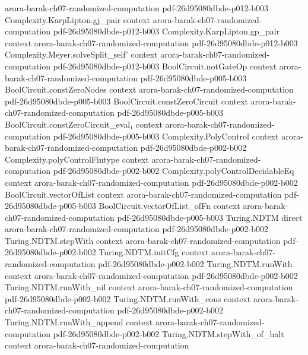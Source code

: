 \begin{theorem}
  {arora-barak-ch07-randomized-computation}
  {pdf-26d95080dbde-p012-b003}
\proofstep
  {Complexity.KarpLipton.gj_pair}
  {context}
  {arora-barak-ch07-randomized-computation}
  {pdf-26d95080dbde-p012-b003}
\proofstep
  {Complexity.KarpLipton.gp_pair}
  {context}
  {arora-barak-ch07-randomized-computation}
  {pdf-26d95080dbde-p012-b003}
\proofstep
  {Complexity.Meyer.solveSplit_self'}
  {context}
  {arora-barak-ch07-randomized-computation}
  {pdf-26d95080dbde-p012-b003}
\proofstep
  {BoolCircuit.notGateOp}
  {context}
  {arora-barak-ch07-randomized-computation}
  {pdf-26d95080dbde-p005-b003}
\proofstep
  {BoolCircuit.constZeroNodes}
  {context}
  {arora-barak-ch07-randomized-computation}
  {pdf-26d95080dbde-p005-b003}
\proofstep
  {BoolCircuit.constZeroCircuit}
  {context}
  {arora-barak-ch07-randomized-computation}
  {pdf-26d95080dbde-p005-b003}
\proofstep
  {BoolCircuit.constZeroCircuit_eval₁}
  {context}
  {arora-barak-ch07-randomized-computation}
  {pdf-26d95080dbde-p005-b003}
\proofstep
  {Complexity.PolyControl}
  {context}
  {arora-barak-ch07-randomized-computation}
  {pdf-26d95080dbde-p002-b002}
\proofstep
  {Complexity.polyControlFintype}
  {context}
  {arora-barak-ch07-randomized-computation}
  {pdf-26d95080dbde-p002-b002}
\proofstep
  {Complexity.polyControlDecidableEq}
  {context}
  {arora-barak-ch07-randomized-computation}
  {pdf-26d95080dbde-p002-b002}
\proofstep
  {BoolCircuit.vectorOfList}
  {context}
  {arora-barak-ch07-randomized-computation}
  {pdf-26d95080dbde-p005-b003}
\proofstep
  {BoolCircuit.vectorOfList_ofFn}
  {context}
  {arora-barak-ch07-randomized-computation}
  {pdf-26d95080dbde-p005-b003}
\proofstep
  {Turing.NDTM}
  {direct}
  {arora-barak-ch07-randomized-computation}
  {pdf-26d95080dbde-p002-b002}
\proofstep
  {Turing.NDTM.stepWith}
  {context}
  {arora-barak-ch07-randomized-computation}
  {pdf-26d95080dbde-p002-b002}
\proofstep
  {Turing.NDTM.initCfg}
  {context}
  {arora-barak-ch07-randomized-computation}
  {pdf-26d95080dbde-p002-b002}
\proofstep
  {Turing.NDTM.runWith}
  {context}
  {arora-barak-ch07-randomized-computation}
  {pdf-26d95080dbde-p002-b002}
\proofstep
  {Turing.NDTM.runWith_nil}
  {context}
  {arora-barak-ch07-randomized-computation}
  {pdf-26d95080dbde-p002-b002}
\proofstep
  {Turing.NDTM.runWith_cons}
  {context}
  {arora-barak-ch07-randomized-computation}
  {pdf-26d95080dbde-p002-b002}
\proofstep
  {Turing.NDTM.runWith_append}
  {context}
  {arora-barak-ch07-randomized-computation}
  {pdf-26d95080dbde-p002-b002}
\proofstep
  {Turing.NDTM.stepWith_of_halt}
  {context}
  {arora-barak-ch07-randomized-computation}

\end{theorem}
